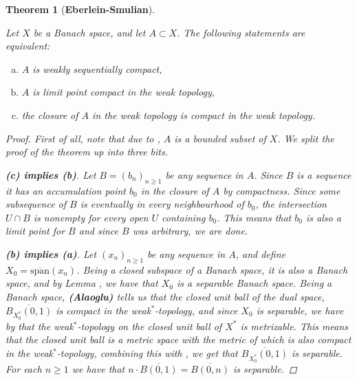 \documentclass[10pt,twoside,openany,final]{memoir}
\theoremstyle{break}
\newtheorem{theorem}[section]{Theorem}
\theoremstyle{Break}
\begin{document}
\begin{theorem}[\bfseries{Eberlein-Smulian}]\label{thm:eberleinsmulian}

Let $X$ be a Banach space, and let $A\subset X$. The following statements are equivalent:
\begin{enumerate}[(a)]
    \item $A$ is weakly sequentially compact,
    \item $A$ is limit point compact in the weak topology,
    \item the closure of $A$ in the weak topology is compact in the weak topology.
\end{enumerate}
\begin{proof}
First of all, note that due to , $A$ is a bounded subset of $X$.
    We split the proof of the theorem up into three bits.

\textbf{(c) implies (b)}. Let $B=(b_n)_{n\geq 1}$ be any sequence in $A$.
    Since $B$ is a sequence it has an accumulation point $b_0$ in the closure of $A$ by compactness.
    Since some subsequence of $B$ is eventually in every neighbourhood of $b_0$, the intersection $U\cap B$ is nonempty for every open $U$ containing $b_0$.
    This means that $b_0$ is also a limit point for $B$ and since $B$ was arbitrary, we are done. 
    
\textbf{(b) implies (a)}.
Let $(x_n)_{n \geq 1}$ be any sequence in $A$, and define $X_0=\overline{\text{span}}(x_n)$. Being a closed subspace of a Banach space, it is also a Banach space, and by Lemma , we have that $X_{0}$ is a separable Banach space. Being a Banach space, \textbf{(Alaoglu)} tells us that the closed unit ball of the dual space, $\overline{B_{X_{0}^*}(0,1)}$ is compact in the weak$^*$-topology, and since $X_{0}$ is separable, we have by  that the weak$^*$-topology on the closed unit ball of $X^*$ is metrizable. This means that the closed unit ball is a metric space with the metric of  which is also compact in the weak$^*$-topology, combining this with , we get that $\overline{B_{X_{0}^*}(0,1)}$ is separable. For each $n \geq 1$ we have that $n \cdot \overline{B(0,1)}=\overline{B(0,n)}$ is separable.


\end{proof}
\end{theorem}
\end{document}
